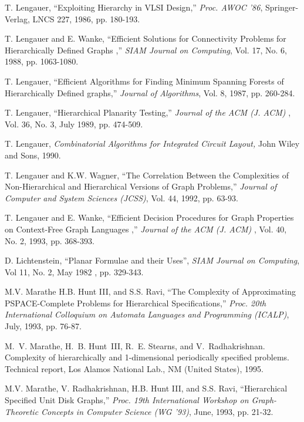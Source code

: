 \begin{thebibliography}{HMRR93}
T. Lengauer,
``Exploiting Hierarchy in VLSI Design,''
{\em Proc.  AWOC '86}, 
Springer-Verlag, LNCS 227, 1986, pp. 180-193.
	
T. Lengauer and  E. Wanke,
``Efficient Solutions for Connectivity Problems for Hierarchically  
Defined Graphs ,''
{\em SIAM Journal on Computing}, 
Vol. 17, No. 6, 1988, pp. 1063-1080.




T. Lengauer,
``Efficient Algorithms for Finding Minimum Spanning Forests of 
Hierarchically Defined graphs,''
{\em Journal of Algorithms}, Vol. 8, 1987, pp. 260-284.


T. Lengauer,
``Hierarchical Planarity Testing,''
{\em Journal of the ACM (J. ACM) }, 
Vol. 36, No. 3, July 1989, pp. 474-509.


T. Lengauer,
{\em Combinatorial Algorithms for Integrated Circuit Layout,}
John Wiley and Sons, 1990.


T. Lengauer and  K.W. Wagner,
``The Correlation Between the Complexities of Non-Hierarchical and
Hierarchical Versions of Graph Problems,''
{\em Journal of Computer and System Sciences (JCSS)}, 
Vol. 44,  1992, pp. 63-93. 



T. Lengauer and  E. Wanke,
``Efficient Decision Procedures for Graph Properties on Context-Free 
Graph Languages ,''
{\em Journal of the ACM (J. ACM) }, 
Vol. 40, No. 2, 1993, pp. 368-393.

 D. Lichtenstein,
``Planar Formulae and their Uses'', 
{\em SIAM Journal on Computing},
Vol 11, No. 2, May 1982 , pp. 329-343.

 M.V. Marathe H.B. Hunt III,  and S.S. Ravi,
``The Complexity of Approximating PSPACE-Complete Problems for 
Hierarchical Specifications,''
{\em Proc. 20th 
International Colloquium on Automata Languages and Programming (ICALP)}, 
July, 1993, pp. 76-87.

M.~V. Marathe, H.~B. Hunt~III, R.~E. Stearns, and V.~Radhakrishnan.
\newblock Complexity of hierarchically and 1-dimensional periodically specified
  problems.
\newblock Technical report, Los Alamos National Lab., NM (United States), 1995.


M.V. Marathe, V. Radhakrishnan,  H.B. Hunt III,  and S.S. Ravi,
``Hierarchical Specified Unit Disk Graphs,''
{\em Proc. 19th International 
Workshop on Graph-Theoretic Concepts in Computer Science (WG '93)}, 
June, 1993, pp. 21-32. 





\end{thebibliography}
